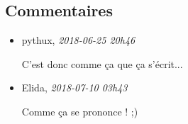 \hypertarget{commentaires}{%
\subsection{Commentaires}\label{commentaires}}

\begin{itemize}
\item
  pythux, \emph{2018-06-25 20h46}

  C'est donc comme ça que ça s'écrit...
\item
  Elida, \emph{2018-07-10 03h43}

  Comme ça se prononce ! ;)
\end{itemize}
